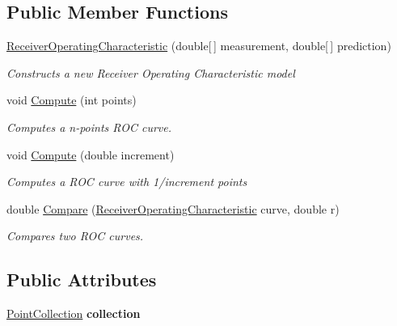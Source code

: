 \subsection*{Public Member Functions}
\begin{DoxyCompactItemize}
\item 
\hyperlink{class_crowdsourcing_project_1_1_statistics_1_1_receiver_operating_characteristic_a9a4c7b63ce6eee404b29ed49918f7f15}{Receiver\+Operating\+Characteristic} (double\mbox{[}$\,$\mbox{]} measurement, double\mbox{[}$\,$\mbox{]} prediction)
\begin{DoxyCompactList}\small\item\em Constructs a new Receiver Operating Characteristic model \end{DoxyCompactList}\item 
void \hyperlink{class_crowdsourcing_project_1_1_statistics_1_1_receiver_operating_characteristic_a6f85910fcec4797bcf43ffa280dfd539}{Compute} (int points)
\begin{DoxyCompactList}\small\item\em Computes a n-\/points R\+O\+C curve. \end{DoxyCompactList}\item 
void \hyperlink{class_crowdsourcing_project_1_1_statistics_1_1_receiver_operating_characteristic_a7fcfa4f4ede738aee8496d5b8ea5733f}{Compute} (double increment)
\begin{DoxyCompactList}\small\item\em Computes a R\+O\+C curve with 1/increment points \end{DoxyCompactList}\item 
double \hyperlink{class_crowdsourcing_project_1_1_statistics_1_1_receiver_operating_characteristic_a1f75eac7968344a9459f2903ded545cc}{Compare} (\hyperlink{class_crowdsourcing_project_1_1_statistics_1_1_receiver_operating_characteristic}{Receiver\+Operating\+Characteristic} curve, double r)
\begin{DoxyCompactList}\small\item\em Compares two R\+O\+C curves. \end{DoxyCompactList}\end{DoxyCompactItemize}
\subsection*{Public Attributes}
\begin{DoxyCompactItemize}
\item 
\hypertarget{class_crowdsourcing_project_1_1_statistics_1_1_receiver_operating_characteristic_a991d81f989e5822b615bc768f38143d8}{}\hyperlink{class_crowdsourcing_project_1_1_statistics_1_1_receiver_operating_characteristic_1_1_point_collection}{Point\+Collection} {\bfseries collection}\label{class_crowdsourcing_project_1_1_statistics_1_1_receiver_operating_characteristic_a991d81f989e5822b615bc768f38143d8}

\end{DoxyCompactItemize}
